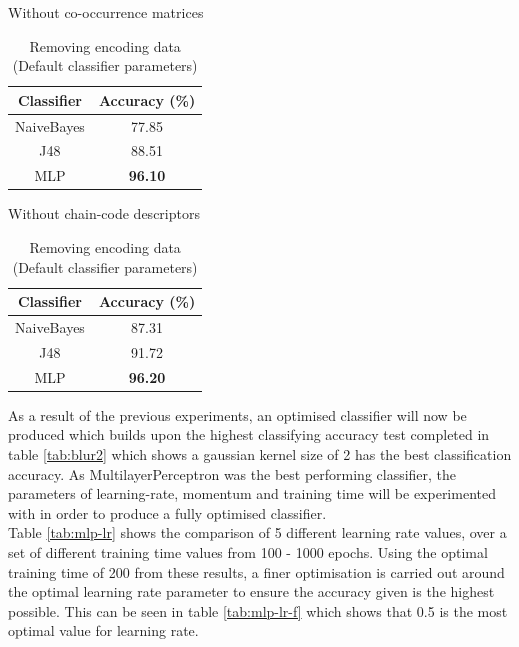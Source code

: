 \documentclass[12pt]{article}
\begin{document}
    \begin{table}[H]
      \begin{subtable}{.5\linewidth}
        \centering
        \caption{Without co-occurrence matrices}
        \begin{tabular}{c|c}
          \toprule
          \multicolumn{1}{c|}{Classifier} & \multicolumn{1}{c}{Accuracy (\%)} \\
          \midrule
          NaiveBayes & 77.85 \\
          J48   & 88.51 \\
          MLP   & \textbf{96.10} \\
          \bottomrule
        \end{tabular}%
        \label{tab:no-co-occur}%
      \end{subtable}
      \begin{subtable}{.5\linewidth}
        \centering
        \caption{Without chain-code descriptors}
        \begin{tabular}{c|c}
        \toprule
        Classifier & Accuracy (\%) \\
        \midrule
        NaiveBayes & 87.31 \\
        J48   & 91.72 \\
        MLP   & \textbf{96.20} \\
        \bottomrule
        \end{tabular}%
        \label{tab:no-chain-code}%
      \end{subtable}
      \caption{Removing encoding data (Default classifier parameters)}
      \label{tab:no-encoding}
    \end{table}
    As a result of the previous experiments, an optimised classifier will now be produced which builds upon the highest classifying accuracy test completed in table \ref{tab:blur2} which shows a gaussian kernel size of 2 has the best classification accuracy. As MultilayerPerceptron was the best performing classifier, the parameters of learning-rate, momentum and training time will be experimented with in order to produce a fully optimised classifier.\\

    Table \ref{tab:mlp-lr} shows the comparison of 5 different learning rate values, over a set of different training time values from 100 - 1000 epochs. Using the optimal training time of 200 from these results, a finer optimisation is carried out around the optimal learning rate parameter to ensure the accuracy given is the highest possible. This can be seen in table \ref{tab:mlp-lr-f} which shows that 0.5 is the most optimal value for learning rate.
\end{document}
